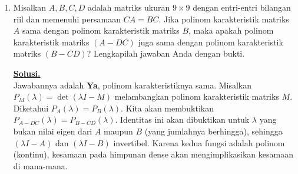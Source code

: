 \documentclass[12pt,twoside]{article}
\newenvironment{solution}
{
	\par\noindent\textbf{\underline{Solusi.}}\\
}
{
	\par
}
\begin{document}
\begin{enumerate}
  \item Misalkan $A, B, C, D$ adalah matriks ukuran $9 \times 9$ dengan entri-entri bilangan riil dan memenuhi persamaan $CA = BC$. Jika polinom karakteristik matriks $A$ sama dengan polinom karakteristik matriks $B$, maka apakah polinom karakteristik matriks $(A - DC)$ juga sama dengan polinom karakteristik matriks $(B - CD)$? Lengkapilah jawaban Anda dengan bukti.

        \begin{solution}
          Jawabannya adalah \textbf{Ya}, polinom karakteristiknya sama.
          Misalkan $P_M(\lambda) = \det(\lambda I - M)$ melambangkan polinom karakteristik matriks $M$. Diketahui $P_A(\lambda) = P_B(\lambda)$.
          Kita akan membuktikan $P_{A-DC}(\lambda) = P_{B-CD}(\lambda)$.
          Identitas ini akan dibuktikan untuk $\lambda$ yang bukan nilai eigen dari $A$ maupun $B$ (yang jumlahnya berhingga), sehingga $(\lambda I - A)$ dan $(\lambda I - B)$ invertibel. Karena kedua fungsi adalah polinom (kontinu), kesamaan pada himpunan dense akan mengimplikasikan kesamaan di mana-mana.


\end{solution}
\end{enumerate}
\end{document}
